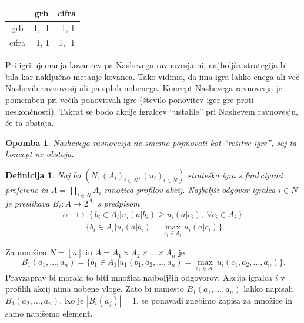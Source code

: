 \documentclass[10pt, a4paper]{article}
\newtheorem{defi}[izr]{Definicija}
\newenvironment{noticeB}{%
  \tcolorbox[%
  notitle,
  empty,
  enhanced,  %
  breakable,
  coltext=black,
  colback=white, 
  fontupper=\rmfamily,
  parbox=false,
  noparskip,
  sharp corners,
  boxrule=-1pt,  %
  frame hidden,
  left=7pt,  %
  right=7pt,
  top=5pt,
  bottom=5pt,
  before skip=2.5ex plus 2pt,
  after skip=2.5ex plus 2pt,
  borderline west = {1.5pt}{-0.1pt}{blue!30!black}, %
  overlay unbroken and last={%
    \draw[color=black, line width=1.25pt]
    ($(frame.south west)+(1.pt, -0.1pt)$) -- ++(2em, 0);
  }
  ]}
{\endtcolorbox}
\newenvironment{definicija}{\begin{defi}\begin{noticeB}}{%
    \end{noticeB}\end{defi}}
\newtheorem*{opomba}{Opomba}
\begin{document}
\begin{center}
    {\begin{tabular}{c|c|c|}
        & \textrm{grb} & \textrm{cifra}\\
        \hline
        \textrm{grb} & 1, -1 & -1, 1\\
        \hline
        \textrm{cifra} & -1, 1 & 1, -1\\
        \hline
    \end{tabular}}        
\end{center}

Pri igri ujemanja kovancev pa Nashevega ravnovesja ni; najboljša strategija bi bila kar naključno metanje kovanca. Tako vidimo,
da ima igra lahko enega ali več Nashevih ravnovesij ali pa sploh nobenega.
Koncept Nashevega ravnovesja je pomemben pri večih ponovitvah igre (število ponovitev iger gre proti neskončnosti).
Takrat se bodo akcije igralcev "`ustalile"' pri Nashevem ravnovesju, če ta obstaja.

\begin{opomba}
  Nashevega ravnovesja ne smemo pojmovati kot "`rešitve igre"', saj ta koncept ne obstaja.
\end{opomba}

\begin{definicija}
  Naj bo $(N, (A_i)_{i \in N}, (u_i)_{i \in N})$ strateška igra s funkcijami preferenc in
  $A = \prod_{i \in N} A_i$ množica profilov akcij. Najboljši odgovor igralca $i \in N$
  je preslikava $B_i: A \to 2^{A_i}$ s predpisom 
  \begin{align*}
    \alpha &\mapsto \left\lbrace b_i \in A_i \big| u_i (a | b_i) \geq u_i (a | c_i),\ \forall c_i \in A_i \right\rbrace\\
    &= \{b_i \in A_i \big| u_i (a | b_i) = \max_{c_i \in A_i} u_i (a | c_i)\}.
  \end{align*}
\end{definicija}

Za množico $N = [n]$ in $A = A_1 \times A_2 \times \dots \times A_n$ je 
$$B_1 (a_1, \dots, a_n) = \{b_1 \in A_1 \big| u_1 (b_1, a_2, \dots, a_n) = \max_{c_1 \in A_1} u_i (c_1, a_2, \dots, a_n)\}.$$
Pravzaprav bi morala to biti množica najboljših odgovorov.
Akcija igralca $i$ v profilih akcij nima nobene vloge. Zato bi namesto 
$B_1(a_1, \dots, a_n)$ lahko napisali $B_1(a_2, \dots, a_n)$.
Ko je $|B_i (a_j)| = 1$, se ponavadi znebimo zapisa za množice in samo napišemo element.
\end{document}
